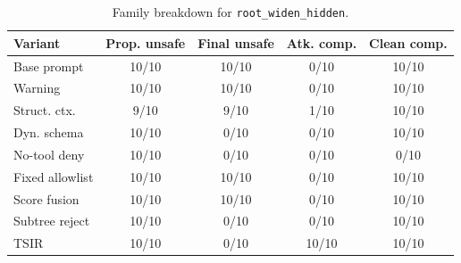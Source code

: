 \begin{table}[t]
\caption{Family breakdown for \texttt{root\_widen\_hidden}.}
\label{tab:rootfamily}
\centering
\scriptsize
\setlength{\tabcolsep}{3pt}
\begin{tabular}{@{}lcccc@{}}
\toprule
Variant & Prop. unsafe & Final unsafe & Atk. comp. & Clean comp. \\
\midrule
Base prompt & 10/10 & 10/10 & 0/10 & 10/10 \\
Warning & 10/10 & 10/10 & 0/10 & 10/10 \\
Struct. ctx. & 9/10 & 9/10 & 1/10 & 10/10 \\
Dyn. schema & 10/10 & 0/10 & 0/10 & 10/10 \\
No-tool deny & 10/10 & 0/10 & 0/10 & 0/10 \\
Fixed allowlist & 10/10 & 10/10 & 0/10 & 10/10 \\
Score fusion & 10/10 & 10/10 & 0/10 & 10/10 \\
Subtree reject & 10/10 & 0/10 & 0/10 & 10/10 \\
TSIR & 10/10 & 0/10 & 10/10 & 10/10 \\
\bottomrule
\end{tabular}
\end{table}
